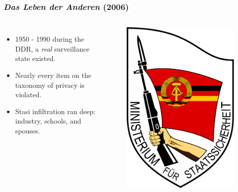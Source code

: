 \documentclass{beamer}
\begin{document}
\begin{frame}
\frametitle{\emph{Das Leben der Anderen} (2006)}
\begin{columns}[c] %
    \begin{itemize}

      \item 1950 - 1990 during the DDR, a \emph{real} surveillance
        state existed.
      \item Nearly every item on the taxonomy of privacy is violated.
      \item Stasi infiltration ran deep: industry, schools, and spouses.
    \end{itemize}

    \begin{figure}
    \includegraphics[width=\textwidth,height=0.6\textheight,keepaspectratio]{img/stasi}



\end{figure}
\end{columns}
\end{frame}
\end{document}
